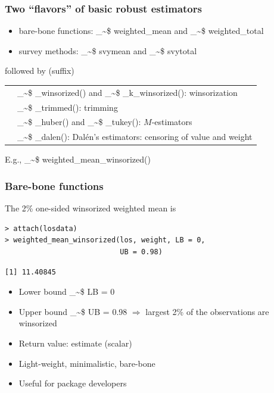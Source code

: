 \documentclass[framenumber,t]{beamer}
\makeatletter
\newcommand\code{\bgroup\@makeother\_\@makeother\~\@makeother\$\@makeother\^\@codex}
\def\@codex#1{{\normalfont\ttfamily\hyphenchar\font=-1 #1}\egroup}
\makeatother
\begin{document}
\begin{frame}[fragile]
\frametitle{Two ``flavors'' of basic robust estimators\vspace{0.5em}}
\begin{itemize}
    \item \alert{bare-bone} functions: \code{weighted_mean} and
        \code{weighted_total}
    \item \alert{survey} methods: \code{svymean} and \code{svytotal}
\end{itemize}
\vspace{0.5em}
followed by (suffix)
\vspace{1em}
\begin{tabular}{ll}
    \addlinespace
    &\code{_winsorized()} and \code{_k_winsorized()}: winsorization\\
    \addlinespace
    &\code{_trimmed()}: trimming\\
    \addlinespace
    &\code{_huber()} and \code{_tukey()}: $M$-estimators\\
    \addlinespace
    &\code{_dalen()}: Dal{\'e}n's estimators: censoring of value and weight\\
\end{tabular}
E.g., \code{weighted_mean_winsorized()}
\end{frame}

\begin{frame}[fragile]
    \frametitle{Bare-bone functions}
    The 2\% one-sided \alert{winsorized weighted mean} is

    \begin{lstlisting}[style=in_big]
> attach(losdata)
> weighted_mean_winsorized(los, weight, LB = 0,
                           UB = 0.98)
    \end{lstlisting}
    \vspace{-1em}
    \begin{lstlisting}[style=out_big]
[1] 11.40845
    \end{lstlisting}
    \vspace{0.5em}
    \begin{itemize}
        \setlength\itemsep{0.5em}
        \item Lower bound \code{LB} = 0
        \item Upper bound \code{UB = 0.98} \alert{$\boldsymbol{\Rightarrow}$}
            largest 2\% of the observations are winsorized
        \item Return value: estimate (scalar)
        \item Light-weight, minimalistic, bare-bone
        \item Useful for package developers
    \end{itemize}
\end{frame}
\end{document}
